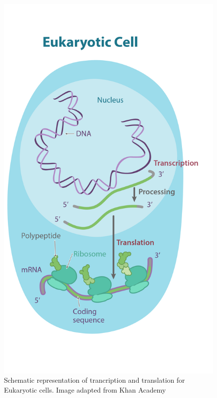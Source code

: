 \begin{figure}
    \centering
    \includegraphics[scale=0.5]{eukaryotic_cell.png}
    \caption{Schematic representation of trancription and translation for Eukaryotic cells. Image adapted from Khan Academy \cite{khan}}
    \label{image_1}
\end{figure}